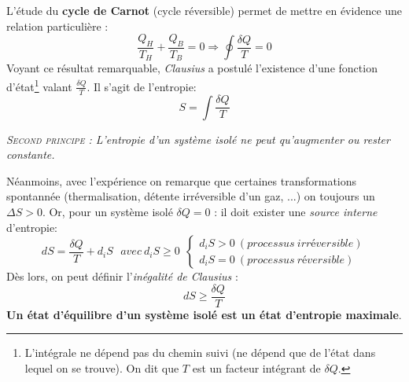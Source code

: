 \documentclass[11pt, a4paper, openany]{book}
\begin{document}
		L'étude du \textbf{cycle de Carnot} (cycle réversible) permet de mettre en évidence une relation particulière :
		\begin{equation}
			\frac{Q_H}{T_H}+\frac{Q_B}{T_B}=0\Rightarrow\oint \frac{\delta Q}{T} = 0
		\end{equation}
		Voyant ce résultat remarquable, \textit{Clausius} a postulé l'existence d'une fonction d'état\footnote{L'intégrale ne dépend pas du chemin suivi (ne dépend que de l'état dans lequel on se trouve). On dit que $T$ est un facteur intégrant de $\delta Q$.} valant $\frac{\delta Q}{T}$. Il s'agit de l'entropie:
		\begin{equation}
			S = \int \frac{\delta Q}{T}
		\end{equation}
		\begin{center}
			\textit{\textsc{Second principe :} L'entropie d'un système isolé ne peut qu'augmenter ou rester constante.}
		\end{center}
		Néanmoins, avec l'expérience on remarque que certaines transformations spontannée (thermalisation, détente irréversible d'un gaz, ...) on toujours un $\Delta S > 0$. Or, pour un système isolé $\delta Q  = 0$ : il doit exister une \textit{source interne} d'entropie:
		\begin{equation}
			dS = \frac{\delta Q}{T} + d_i S\ \ \ avec\ d_iS \geq 0\ \ \left\{\begin{array}{l}
			d_iS > 0\ (processus\ irréversible)\\
			d_iS = 0\ (processus\ réversible)
			\end{array}\right.
		\end{equation}
		Dès lors, on peut définir l'\textit{inégalité de Clausius} : 
		\begin{equation}
			dS \geq \frac{\delta Q}{T}
		\end{equation}
		\textbf{Un état d'équilibre d'un système isolé est un état d'entropie maximale}.\\
		
		
\end{document}
